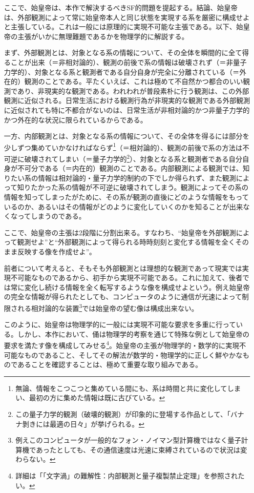\documentclass[10pt, a5paper, twoside]{jsarticle}
\theoremstyle{definition}
\begin{document}
		ここで、始皇帝は、本作で解決するべきSF的問題を提起する。結論、始皇帝は、外部観測によって常に始皇帝本人と同じ状態を実現する系を厳密に構成せよと主張している。これは一般には原理的に実現不可能な主張である。以下、始皇帝の主張がいかに無理難題であるかを物理学的に解説する。

		まず、外部観測とは、対象となる系の情報について、その全体を瞬間的に全て得ることが出来（＝非相対論的）、観測の前後で系の情報は破壊されず（＝非量子力学的）、対象となる系と観測者である自分自身が完全に分離されている（＝外在的）観測のことである。平たくいえば、これは極めて不自然かつ都合のいい観測であり、非現実的な観測である。われわれが普段素朴に行う観測は、この外部観測に近似される。日常生活における観測行為が非現実的な観測である外部観測に近似されても特に不都合がないのは、日常生活が非相対論的かつ非量子力学的かつ外在的な状況に限られているからである。

		一方、内部観測とは、対象となる系の情報について、その全体を得るには部分を少しずつ集めていかなければならず\footnote{無論、情報をこつこつと集めている間にも、系は時間と共に変化してしまい、最初の方に集めた情報は既に古びている。}（＝相対論的）、観測の前後で系の方法は不可逆に破壊されてしまい（＝量子力学的\footnote{この量子力学的観測（破壊的観測）が印象的に登場する作品として、「バナナ剝きには最適の日々」が挙げられる。}）、対象となる系と観測者である自分自身が不可分である（＝内在的）観測のことである。内部観測による観測では、知りたい系の情報は相対論的・量子力学的制約の下でしか得られず、また観測によって知りたかった系の情報が不可逆に破壊されてしまう。観測によってその系の情報を知ってしまったがために、その系が観測の直後にどのような情報をもっているのか、あるいはその情報がどのように変化していくのかを知ることが出来なくなってしまうのである。

		ここで、始皇帝の主張は2段階に分割出来る。すなわち、“始皇帝を外部観測によって観測せよ”と“外部観測によって得られる時時刻刻と変化する情報を全くそのまま反映する像を作成せよ”。

		前者について考えると、そもそも外部観測とは理想的な観測であって現実では実現不可能なものであるから、初手から実現不可能である。これに加えて、後者では常に変化し続ける情報を全く転写するような像を構成せよという。例え始皇帝の完全な情報が得られたとしても、コンピュータのように通信が光速によって制限される相対論的な装置\footnote{例えこのコンピュータが一般的なフォン・ノイマン型計算機ではなく量子計算機であったとしても、その通信速度は光速に束縛されているので状況は変わらない。}では始皇帝の望む像は構成出来ない。

		このように、始皇帝は物理学的に一般には実現不可能な要求を多重に行っている。しかし、本作において、俑は物理学的考察を通じて特殊な例として始皇帝の要求を満たす像を構成してみせる\footnote{詳細は「「文字渦」の難解性：内部観測と量子複製禁止定理」\cite{sshimo1}を参照されたい。}。始皇帝の主張が物理学的・数学的に実現不可能なものであること、そしてその解法が数学的・物理学的に正しく鮮やかなものであることを確認することは、極めて重要な取り組みである。
\end{document}

